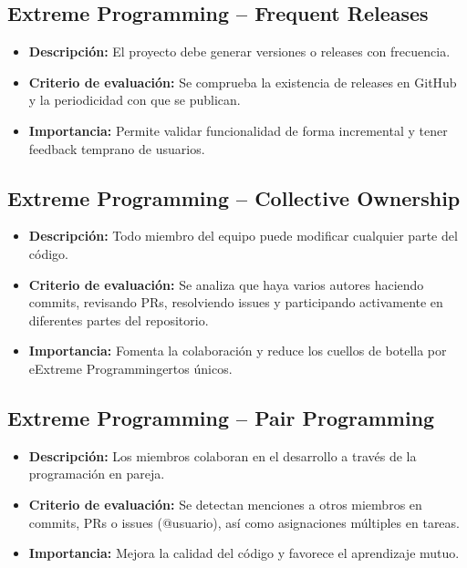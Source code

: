 \subsection{Extreme Programming – Frequent Releases}

\begin{itemize}
  \item \textbf{Descripción:} El proyecto debe generar versiones o releases con frecuencia.
  \item \textbf{Criterio de evaluación:} Se comprueba la existencia de releases en GitHub y la periodicidad con que se publican.
  \item \textbf{Importancia:} Permite validar funcionalidad de forma incremental y tener feedback temprano de usuarios.
\end{itemize}

\subsection{Extreme Programming – Collective Ownership}

\begin{itemize}
  \item \textbf{Descripción:} Todo miembro del equipo puede modificar cualquier parte del código.
  \item \textbf{Criterio de evaluación:} Se analiza que haya varios autores haciendo commits, revisando PRs, resolviendo issues y participando activamente en diferentes partes del repositorio.
  \item \textbf{Importancia:} Fomenta la colaboración y reduce los cuellos de botella por eExtreme Programmingertos únicos.
\end{itemize}

\subsection{Extreme Programming – Pair Programming}

\begin{itemize}
  \item \textbf{Descripción:} Los miembros colaboran en el desarrollo a través de la programación en pareja.
  \item \textbf{Criterio de evaluación:} Se detectan menciones a otros miembros en commits, PRs o issues (@usuario), así como asignaciones múltiples en tareas.
  \item \textbf{Importancia:} Mejora la calidad del código y favorece el aprendizaje mutuo.
\end{itemize}

